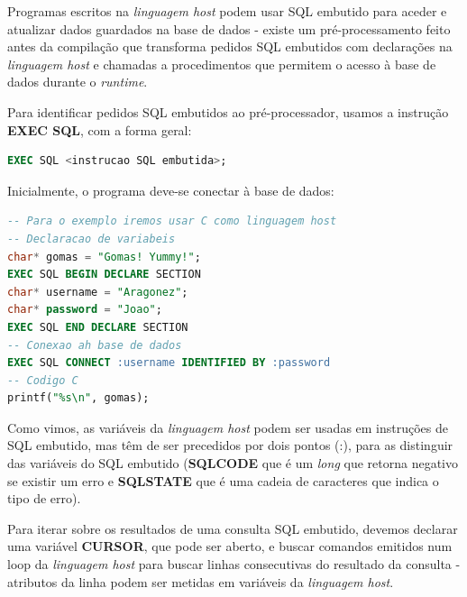 \documentclass[oneside]{book}
\theoremstyle{definition}
\begin{document}
Programas escritos na \textit{linguagem host} podem usar SQL embutido para aceder e atualizar dados guardados na base de dados - existe um pré-processamento feito antes da compilação que transforma pedidos SQL embutidos com declarações na \textit{linguagem host} e chamadas a procedimentos que permitem o acesso à base de dados durante o \textit{runtime}.

Para identificar pedidos SQL embutidos ao pré-processador, usamos a instrução \textbf{EXEC SQL}, com a forma geral:

\begin{lstlisting}[language=SQL, morekeywords={TRIGGER, REPLACE, FUNCTION, RETURNS, $$, IF, NEW, ELSEIF, ENDIF, RETURN, NEW, LANGUAGE, AFTER, FOR, EACH, ROW, PROCEDURE, BEFORE}, framesep=8pt, xleftmargin=40pt, framexleftmargin=40pt, frame=tb, framerule=0pt]
EXEC SQL <instrucao SQL embutida>;
\end{lstlisting}

Inicialmente, o programa deve-se conectar à base de dados:
\begin{lstlisting}[language=SQL, morekeywords={char*, EXEC, SQL, CONNECT, IDENTIFIED, DECLARE, SECTION}, framesep=8pt, xleftmargin=40pt, framexleftmargin=40pt, frame=tb, framerule=0pt]
-- Para o exemplo iremos usar C como linguagem host
-- Declaracao de variabeis
char* gomas = "Gomas! Yummy!";
EXEC SQL BEGIN DECLARE SECTION
char* username = "Aragonez";
char* password = "Joao";
EXEC SQL END DECLARE SECTION
-- Conexao ah base de dados
EXEC SQL CONNECT :username IDENTIFIED BY :password
-- Codigo C
printf("%s\n", gomas);
\end{lstlisting}

Como vimos, as variáveis da \textit{linguagem host} podem ser usadas em instruções de SQL embutido, mas têm de ser precedidos por dois pontos (:), para as distinguir das variáveis do SQL embutido (\textbf{SQLCODE} que é um \textit{long} que retorna negativo se existir um erro e \textbf{SQLSTATE} que é uma cadeia de caracteres que indica o tipo de erro).

Para iterar sobre os resultados de uma consulta SQL embutido, devemos declarar uma variável \textbf{CURSOR}, que pode ser aberto, e buscar comandos emitidos num loop da \textit{linguagem host} para buscar linhas consecutivas do resultado da consulta - atributos da linha podem ser metidas em variáveis da \textit{linguagem host}.
\end{document}
